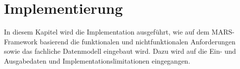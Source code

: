 %


\chapter{Implementierung}\label{ch:implementierung}

In diesem Kapitel wird die Implementation ausgeführt, wie auf dem MARS-Framework basierend die funktionalen und nichtfunktionalen Anforderungen sowie das fachliche Datenmodell eingebaut wird.
Dazu wird auf die Ein- und Ausgabedaten und Implementationslimitationen eingegangen.





